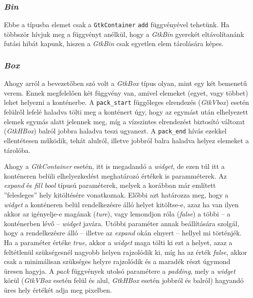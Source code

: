 \documentclass[a4paper,10pt]{article}
\begin{document}
\subsubsection{\textit{Bin}}

Ebbe a típusba elemet csak a \texttt{GtkContainer} \texttt{add} függvényével tehetünk. Ha többször hívjuk meg a függvényt anélkül, hogy a \textit{GtkBin} gyerekét eltávolítanánk futási hibát kapunk, hiszen a \textit{GtkBin} csak egyetlen elem tárolására képes.

\subsubsection{\textit{Box}}

Ahogy arról a bevezetőben szó volt a \textit{GtkBox} típus olyan, mint egy két bemenetű verem. Ennek megfelelően két függvény van, amivel elemeket (egyet, vagy többet) lehet helyezni a konténerbe. A \texttt{pack\_start} függőleges elrendezés (\textit{GtkVbox}) esetén felülről lefelé haladva tölti meg a konténert úgy, hogy az egymást után elhelyezett elemek egymás alatt jelennek meg, míg a vízszintes elrendezést biztosító változat (\textit{GtkHBox}) balról jobbra haladva teszi ugyanezt. A \texttt{pack\_end} hívás ezekkel ellentétesen működik, tehát alulról, illetve jobbról balra haladva helyez elemeket a tárolóba.

Ahogy a \textit{GtkContainer} esetén, itt is megadandó a \textit{widget}, de ezen túl itt a konténeren belüli elhelyezkedést meghatározó értékek is paramméterek. Az \textit{expand} és \textit{fill} \textit{bool} típusú paraméterek, melyek a korábban már említett ''felesleges'' hely kitöltésére vonatkoznak. Előbbi azt határozza meg, hogy a \textit{widget} a konténeren belül rendelkezésre álló helyet kitöltse-e, azaz ha van ilyen akkor az igényelje-e magának (\textit{ture}), vagy lemondjon róla (\textit{false}) a többi -- a konténerben lévő -- \textit{widget} javára. Utóbbi paraméter annak beállítására szolgál, hogy a rendelkezésre álló -- illetve az \textit{expand} okán elnyert -- hellyel mi történjék. Ha a paraméter értéke \textit{true}, akkor a \textit{widget} maga tölti ki ezt a helyet, azaz a feltétlenül szükségesnél nagyobb helyen rajzolódik ki, míg ha az érték \textit{false}, akkor csak a minimálisan szükséges helyre rajzolódik és a maradék részt úgymond üresen hagyja. A \textit{pack} függvények utolsó paramétere a \textit{padding}, mely a \textit{widget} körül (\textit{GtkVBox} esetén felül és alul, \textit{GtkHBox} esetén jobbról és balról) hagyandó üres hely értékét adja meg pixelben.
\end{document}
